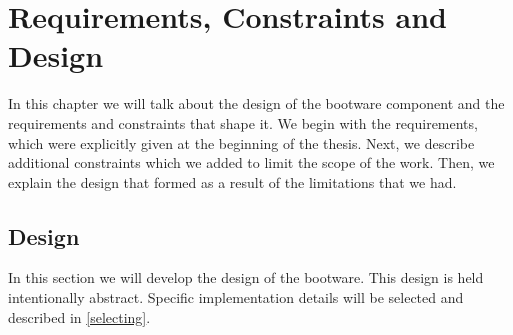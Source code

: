 \chapter{Requirements, Constraints and Design}

In this chapter we will talk about the design of the bootware component and the requirements and constraints that shape it.
We begin with the requirements, which were explicitly given at the beginning of the thesis.
Next, we describe additional constraints which we added to limit the scope of the work.
Then, we explain the design that formed as a result of the limitations that we had.




\section{Design}

In this section we will develop the design of the bootware.
This design is held intentionally abstract.
Specific implementation details will be selected and described in \autoref{selecting}.





